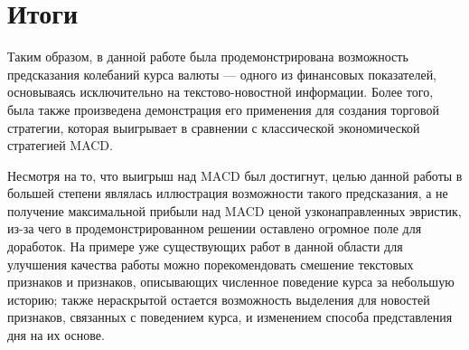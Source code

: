 \documentclass[pdftex,ptm,14pt,a4paper]{extreport}
\begin{document}
\chapter{Итоги}

Таким образом, в данной работе была продемонстрирована возможность предсказания колебаний курса
валюты --- одного из финансовых показателей, основываясь исключительно на текстово-новостной информации.
Более того, была также произведена демонстрация его применения для создания торговой стратегии,
которая выигрывает в сравнении с классической экономической стратегией MACD.

Несмотря на то, что выигрыш над MACD был достигнут, целью данной работы в большей степени являлась иллюстрация
возможности такого предсказания, а не получение максимальной прибыли над MACD ценой узконаправленных эвристик,
из-за чего в продемонстрированном решении оставлено огромное поле для доработок.
На примере уже существующих работ в данной области для улучшения качества работы можно порекомендовать
смешение текстовых признаков и признаков, описывающих численное поведение курса за небольшую историю;
также нераскрытой остается возможность выделения для новостей признаков, связанных с поведением курса, и изменением
способа представления дня на их основе.

{}

\end{document}
